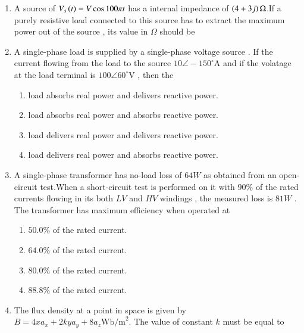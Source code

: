 \documentclass[journal]{IEEEtran}
\begin{document}
\begin{enumerate}
\begin{enumerate}
\end{enumerate}
\item A source of $V_s\left(t\right)=V\cos{100\pi t}$ has a internal impedance of $\left(4+3j\right)\Omega$.If a purely resistive load connected to this source has to extract the maximum power out of the source , its value in $\Omega$ should be 
\begin{enumerate}
\end{enumerate}
\item A single-phase load is supplied by a single-phase voltage source . If the current flowing from the load to the source $10\angle -150^\circ $A and if the volatage at the load terminal is  $100\angle 60^\circ$V , then the
\begin{enumerate}
\item load absorbs real power and delivers reactive power. 
\item load absorbs real power and absorbs reactive power.
\item load delivers real power and delivers reactive power.
\item load delivers real power and absorbs reactive power.
\end{enumerate}
\newpage
\item A single-phase transformer has no-load loss of $64W$ as obtained from an open-circuit test.When a short-circuit test is performed on it with $90\%$ of the rated currents flowing in its both $LV$ and $HV$ windings , the measured loss is $81W$ . The transformer  has maximum efficiency when operated at 
\begin{enumerate}
\item $ 50.0\% $ of the rated current.
\item $ 64.0\% $ of the rated current.
\item $ 80.0\% $ of the rated current.
\item $ 88.8\% $ of the rated current.
\end{enumerate}
\item The flux density at a point in space is given by $B = 4xa_x + 2k ya_y + 8a_z\text{Wb/m}^2$. The value of constant $k$ must be equal to
\begin{enumerate}
\begin{multicols}{4}

\end{multicols}
\end{enumerate}
\end{enumerate}
\end{document}
